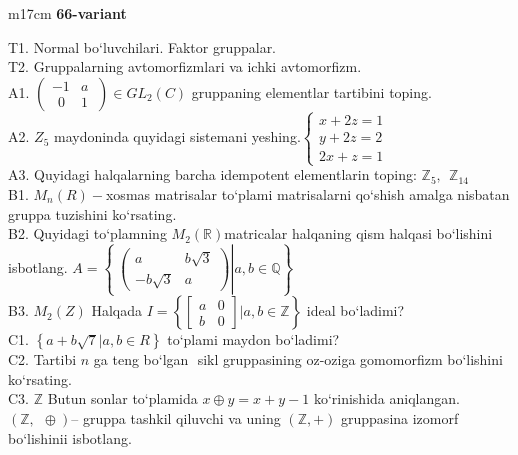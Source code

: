 \documentclass{article}
\begin{document}
\begin{tabular}{m{17cm}}
\textbf{66-variant}
\newline

T1. Normal bo`luvchilari. Faktor gruppalar. \\
T2. Gruppalarning avtomorfizmlari va ichki avtomorfizm. \\
A1. \(\left( \begin{matrix}
 - 1 & a \\
\ \ 0 & 1
\end{matrix}\  \right) \in GL_{2}(C)\) gruppaning elementlar tartibini toping. \\
A2. \(Z_{5}\) maydoninda quyidagi sistemani yeshing.\(\left\{ \begin{matrix}
x + 2z = 1 \\
y + 2z = 2 \\
2x + z = 1
\end{matrix} \right.\ \) \\
A3. Quyidagi halqalarning barcha idempotent elementlarin toping: \(\mathbb{Z}_{5},\ \ \mathbb{Z}_{14}\) \\
B1. \(M_{n}(R) -\)xosmas matrisalar to`plami matrisalarni qo`shish amalga nisbatan gruppa tuzishini ko`rsating. \\
B2. Quyidagi to`plamning \(M_{2}(\mathbb{R})\)matricalar halqaning qism halqasi bo`lishini isbotlang. \(A = \left\{ \left. \ \begin{pmatrix}
a & b\sqrt{3} \\
 - b\sqrt{3} & a
\end{pmatrix} \right|a,b\mathbb{\in Q} \right\}\) \\
B3. \(M_{2}(Z)\) Halqada \(I = \left\{ \begin{bmatrix}
a & 0 \\
b & 0
\end{bmatrix}|a,b\mathbb{\in Z} \right\}\) ideal bo`ladimi? \\
C1. \(\left\{ a + b\sqrt{7}|a,b \in R \right\}\) to`plami maydon bo`ladimi? \\
C2. Tartibi \(n\) ga teng bo`lgan \(< a >\) sikl gruppasining o\textquotesingle z-o\textquotesingle ziga gomomorfizm bo`lishini ko`rsating. \\
C3. \(\mathbb{Z}\) Butun sonlar to`plamida \(x \oplus y = x + y - 1\) ko`rinishida aniqlangan. \((\mathbb{Z},\ \  \oplus )\)-- gruppa tashkil qiluvchi va uning \((\mathbb{Z}, + )\) gruppasina izomorf bo`lishinii isbotlang. \\

\end{tabular}
\vspace{1cm}
\end{document}
